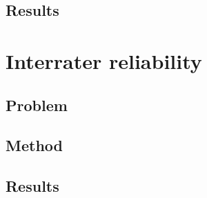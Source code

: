 \subsection{Results}

\section{Interrater reliability}

\subsection{Problem}

\cite{davies1982measuring}

\subsection{Method}

\subsection{Results}
